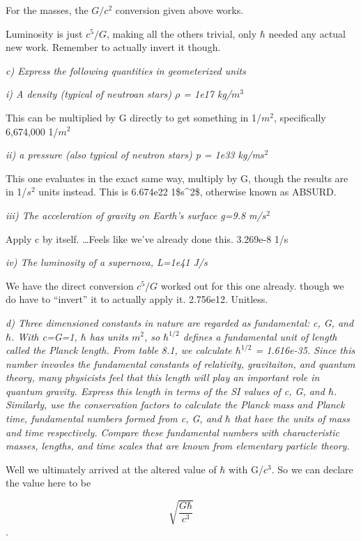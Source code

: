 \documentclass[landscape,letterpaper,10pt,english]{article}
\begin{document}
For the masses, the \(G/c^2\) conversion given above works.

Luminosity is just \(c^5/G\), making all the others trivial, only
\(\hbar\) needed any actual new work. Remember to actually invert it
though.

    \emph{c) Express the following quantities in geometerized units}

\emph{i) A density (typical of neutroan stars) \(\rho\) = 1e17
kg/\(m^3\)}

    This can be multiplied by G directly to get something in 1/\(m^2\),
specifically 6,674,000 1/\(m^2\)

    \emph{ii) a pressure (also typical of neutron stars) p = 1e33
kg/m\(s^2\)}

This one evaluates in the exact same way, multiply by G, though the
results are in 1/\(s^2\) units instead. This is 6.674e22 1\$s\^{}2\$,
otherwise known as ABSURD.

    \emph{iii) The acceleration of gravity on Earth's surface g=9.8
m/\(s^2\)}

Apply c by itself. \ldots Feels like we've already done this. 3.269e-8
1/s

    \emph{iv) The luminosity of a supernova, L=1e41 J/s}

We have the direct conversion \(c^5/G\) worked out for this one already.
though we do have to ``invert'' it to actually apply it. 2.756e12.
Unitless.

    \emph{d) Three dimensioned constants in nature are regarded as
fundamental: c, G, and \(\hbar\). With c=G=1, \(\hbar\) has units
\(m^2\), so \(\hbar^{1/2}\) defines a fundamental unit of length called
the Planck length. From table 8.1, we calculate \(\hbar^{1/2}\) =
1.616e-35. Since this number invovles the fundamental constants of
relativity, gravitaiton, and quantum theory, many physicists feel that
this length will play an important role in quantum gravity. Express this
length in terms of the SI values of c, G, and \(\hbar\). Similarly, use
the conservation factors to calculate the Planck mass and Planck time,
fundamental numbers formed from c, G, and \(\hbar\) that have the units
of mass and time respectively. Compare these fundamental numbers with
characteristic masses, lengths, and time scales that are known from
elementary particle theory.}

    Well we ultimately arrived at the altered value of \(\hbar\) with
G/\(c^3\). So we can declare the value here to be

\[ \sqrt{\frac{G\hbar}{c^3}} \].
\end{document}
